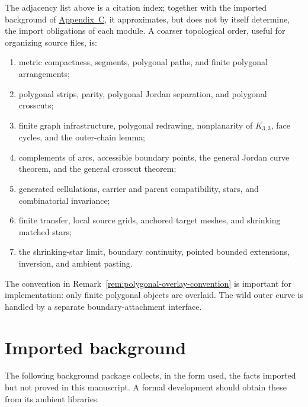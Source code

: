 \documentclass[11pt]{article}
\theoremstyle{mainplain}
\theoremstyle{mainroman}
\theoremstyle{definition}
\numberwithin{equation}{section}
\begin{document}
The adjacency list above is a citation index; together with the
imported background of \hyperref[app:background]{Appendix~C}, it
approximates, but does not by itself determine, the import obligations
of each module. A coarser
topological order, useful for organizing source files, is:
\begin{enumerate}
\item metric compactness, segments, polygonal paths, and finite
      polygonal arrangements;
\item polygonal strips, parity, polygonal Jordan separation, and
      polygonal crosscuts;
\item finite graph infrastructure, polygonal redrawing,
      nonplanarity of $K_{3,3}$, face cycles, and the outer-chain lemma;
\item complements of arcs, accessible boundary points, the general
      Jordan curve theorem, and the general crosscut theorem;
\item generated cellulations, carrier and parent compatibility, stars, and
      combinatorial invariance;
\item finite transfer, local source grids, anchored target meshes,
      and shrinking matched stars;
\item the shrinking-star limit, boundary continuity, pointed bounded
      extensions, inversion, and ambient pasting.
\end{enumerate}

The convention in Remark~\ref{rem:polygonal-overlay-convention} is important
for implementation: only finite polygonal objects are overlaid. The
wild outer curve is handled by a separate boundary-attachment
interface.

\section{Imported background}\label{app:background}

The following background package collects, in the form used, the
facts imported but not proved in this manuscript. A formal development
should obtain these from its ambient libraries.
\end{document}
